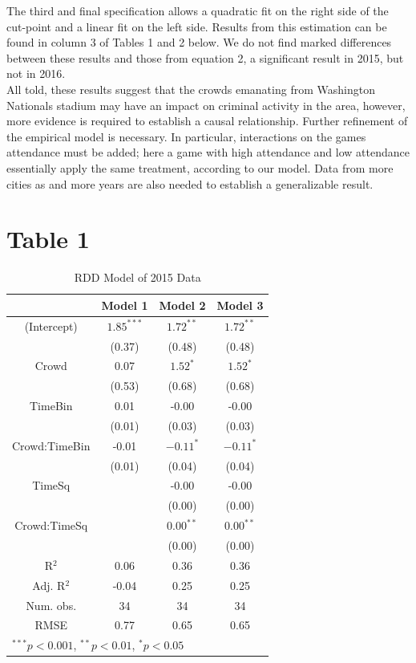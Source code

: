 \documentclass{article}
\begin{document}
The third and final specification allows a quadratic fit on the right side of the cut-point and a linear fit on the left side. Results from this estimation can be found in column 3 of Tables 1 and 2 below. We do not find marked differences between these results and those from equation 2, a significant result in 2015, but not in 2016.\\
 
All told, these results suggest that the crowds emanating from Washington Nationals stadium may have an impact on criminal activity in the area, however, more evidence is required to establish a causal relationship. Further refinement of the empirical model is necessary. In particular, interactions on the games attendance must be added; here a game with high attendance and low attendance essentially apply the same treatment, according to our model. Data from more cities as and more years are also needed to establish a generalizable result.
\newpage
\section*{Table 1}
\begin{table}[hb!]
\begin{center}
\begin{tabular}{c|c|c|c|}
\toprule
 & \multicolumn{1}{c}{Model 1} & \multicolumn{1}{c}{Model 2} & \multicolumn{1}{c}{Model 3} \\
\midrule
(Intercept)   & $1.85^{***}$ & $1.72^{**}$ & $1.72^{**}$ \\
              & (0.37)     & (0.48)    & (0.48)    \\
Crowd         & 0.07       & $1.52^{*}$  & $1.52^{*}$  \\
              & (0.53)     & (0.68)    & (0.68)    \\
TimeBin       & 0.01       & -0.00     & -0.00     \\
              & (0.01)     & (0.03)    & (0.03)    \\
Crowd:TimeBin & -0.01      & $-0.11^{*}$ & $-0.11^{*}$ \\
              & (0.01)     & (0.04)    & (0.04)    \\
TimeSq        &            & -0.00     & -0.00     \\
              &            & (0.00)    & (0.00)    \\
Crowd:TimeSq  &            & $0.00^{**}$ & $0.00^{**}$ \\
              &            & (0.00)    & (0.00)    \\
\midrule
R$^2$         & 0.06       & 0.36      & 0.36      \\
Adj. R$^2$    & -0.04      & 0.25      & 0.25      \\
Num. obs.     & 34         & 34        & 34        \\
RMSE          & 0.77       & 0.65      & 0.65      \\
\bottomrule
\multicolumn{4}{l}{\scriptsize{$^{***}p<0.001$, $^{**}p<0.01$, $^*p<0.05$}}
\end{tabular}
\caption{RDD Model of 2015 Data}
\label{tab:3}
\end{center}
\end{table}
\newpage
\end{document}
